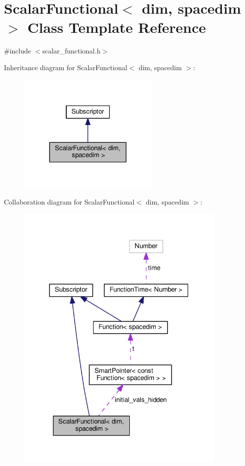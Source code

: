 \hypertarget{class_scalar_functional}{}\section{Scalar\+Functional$<$ dim, spacedim $>$ Class Template Reference}
\label{class_scalar_functional}


{\ttfamily \#include $<$scalar\+\_\+functional.\+h$>$}



Inheritance diagram for Scalar\+Functional$<$ dim, spacedim $>$\+:\nopagebreak
\begin{figure}[H]
\begin{center}
\leavevmode
\includegraphics[width=197pt]{class_scalar_functional__inherit__graph}
\end{center}
\end{figure}


Collaboration diagram for Scalar\+Functional$<$ dim, spacedim $>$\+:\nopagebreak
\begin{figure}[H]
\begin{center}
\leavevmode
\includegraphics[width=292pt]{class_scalar_functional__coll__graph}
\end{center}
\end{figure}
